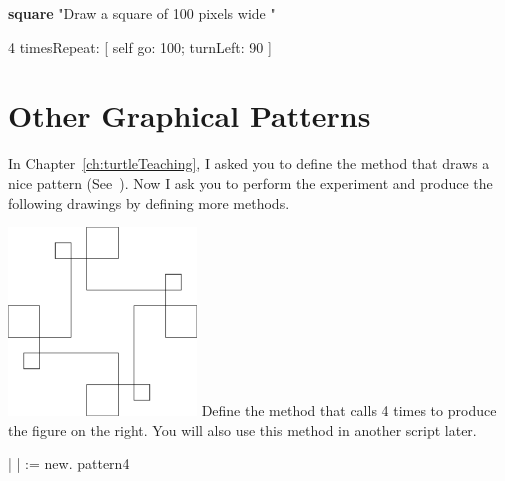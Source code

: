 \begin{method}\label{comp:square}
\textbf{square}
   "Draw a square of 100 pixels wide "

   4 timesRepeat: 
         [ self go: 100;
                  turnLeft: 90 ]
\end{method}


\section{Other Graphical Patterns}
In Chapter~\ref{ch:turtleTeaching}, I asked you to define the method  that draws a nice pattern (See~). Now I ask you to perform  the experiment and produce the following drawings by defining more methods. 





\begin{exofigwithsize}[0.5]{\includegraphics[width=5cm]{compCompleteThing}}
Define the method  that calls  4 times to produce the figure on the right. 
You will also use this method in another script later.

\begin{nalltt}
| \caro |
\caro := \Turtle new.
\caro pattern4
\end{nalltt}
\end{exofigwithsize}

